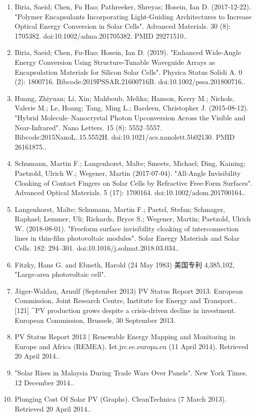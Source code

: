 \begin{enumerate}
\item Biria, Saeid; Chen, Fu Hao; Pathreeker, Shreyas; Hosein, Ian D. (2017-12-22). "Polymer Encapsulants Incorporating Light-Guiding Architectures to Increase Optical Energy Conversion in Solar Cells". Advanced Materials. 30 (8): 1705382. doi:10.1002/adma.201705382. PMID 29271510..
\item Biria, Saeid; Chen, Fu-Hao; Hosein, Ian D. (2019). "Enhanced Wide-Angle Energy Conversion Using Structure-Tunable Waveguide Arrays as Encapsulation Materials for Silicon Solar Cells". Physica Status Solidi A. 0 (2): 1800716. Bibcode:2019PSSAR.21600716B. doi:10.1002/pssa.201800716..
\item Huang, Zhiyuan; Li, Xin; Mahboub, Melika; Hanson, Kerry M.; Nichols, Valerie M.; Le, Hoang; Tang, Ming L.; Bardeen, Christopher J. (2015-08-12). "Hybrid Molecule–Nanocrystal Photon Upconversion Across the Visible and Near-Infrared". Nano Letters. 15 (8): 5552–5557. Bibcode:2015NanoL..15.5552H. doi:10.1021/acs.nanolett.5b02130. PMID 26161875..
\item Schumann, Martin F.; Langenhorst, Malte; Smeets, Michael; Ding, Kaining; Paetzold, Ulrich W.; Wegener, Martin (2017-07-04). "All-Angle Invisibility Cloaking of Contact Fingers on Solar Cells by Refractive Free-Form Surfaces". Advanced Optical Materials. 5 (17): 1700164. doi:10.1002/adom.201700164..
\item Langenhorst, Malte; Schumann, Martin F.; Paetel, Stefan; Schmager, Raphael; Lemmer, Uli; Richards, Bryce S.; Wegener, Martin; Paetzold, Ulrich W. (2018-08-01). "Freeform surface invisibility cloaking of interconnection lines in thin-film photovoltaic modules". Solar Energy Materials and Solar Cells. 182: 294–301. doi:10.1016/j.solmat.2018.03.034..
\item Fitzky, Hans G. and Ebneth, Harold (24 May 1983) 美国专利 4,385,102, "Large-area photovoltaic cell".
\item Jäger-Waldau, Arnulf (September 2013) PV Status Report 2013. European Commission, Joint Research Centre, Institute for Energy and Transport..
[121]
^PV production grows despite a crisis-driven decline in investment. European Commission, Brussels, 30 September 2013.
\item PV Status Report 2013 | Renewable Energy Mapping and Monitoring in Europe and Africa (REMEA). Iet.jrc.ec.europa.eu (11 April 2014). Retrieved 20 April 2014..
\item "Solar Rises in Malaysia During Trade Wars Over Panels". New York Times. 12 December 2014..
\item Plunging Cost Of Solar PV (Graphs). CleanTechnica (7 March 2013). Retrieved 20 April 2014..

\end{enumerate}
